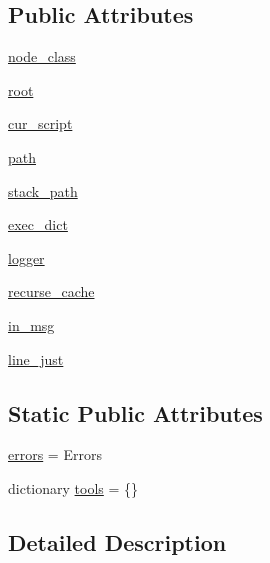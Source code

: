 \subsection*{Public Attributes}
\begin{DoxyCompactItemize}
\item 
\hyperlink{classwaflib_1_1_context_1_1_context_ac9c5d194e7d593bf6b1a1b2771e0d557}{node\+\_\+class}
\item 
\hyperlink{classwaflib_1_1_context_1_1_context_a89adc3ac5396d5dff66b3b7df191804b}{root}
\item 
\hyperlink{classwaflib_1_1_context_1_1_context_a4484fc4ec17a566637b3382dba32ea78}{cur\+\_\+script}
\item 
\hyperlink{classwaflib_1_1_context_1_1_context_aa7551e39947b849817199b8608469545}{path}
\item 
\hyperlink{classwaflib_1_1_context_1_1_context_a3dd26f36f10087e5976da9bedf96a1f1}{stack\+\_\+path}
\item 
\hyperlink{classwaflib_1_1_context_1_1_context_a58d024714f7b6c621cda52d86d6c69d0}{exec\+\_\+dict}
\item 
\hyperlink{classwaflib_1_1_context_1_1_context_a6a366fd9a778429d961e64c14002ac73}{logger}
\item 
\hyperlink{classwaflib_1_1_context_1_1_context_a2bbd84db5a5b6b029f1208b0429698b5}{recurse\+\_\+cache}
\item 
\hyperlink{classwaflib_1_1_context_1_1_context_aa880beaed988d03c20307cb50e3cb5d2}{in\+\_\+msg}
\item 
\hyperlink{classwaflib_1_1_context_1_1_context_aafe29c6b5c51958fb6b0e366d21a72aa}{line\+\_\+just}
\end{DoxyCompactItemize}
\subsection*{Static Public Attributes}
\begin{DoxyCompactItemize}
\item 
\hyperlink{classwaflib_1_1_context_1_1_context_a1823830987e98d2a7185319a339b6dbc}{errors} = Errors
\item 
dictionary \hyperlink{classwaflib_1_1_context_1_1_context_ae43339d845c58ba7b631c928c8092c61}{tools} = \{\}
\end{DoxyCompactItemize}


\subsection{Detailed Description}


